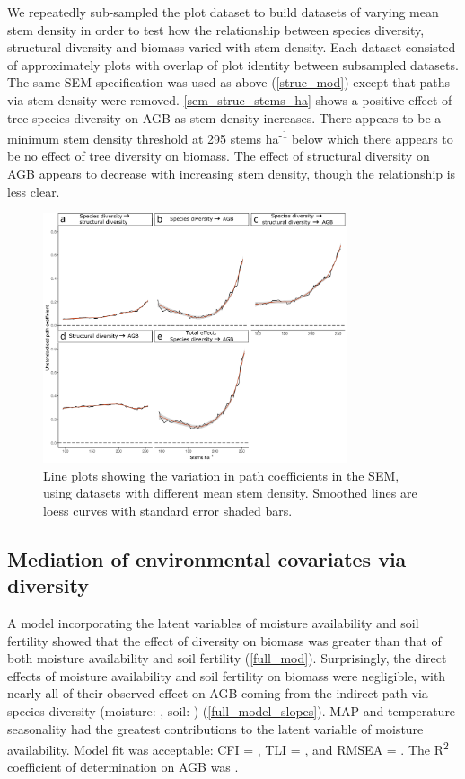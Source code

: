 \documentclass[11pt,a4paper]{article}
\begin{document}
We repeatedly sub-sampled the plot dataset to build \subn{} datasets of varying mean stem density in order to test how the relationship between species diversity, structural diversity and biomass varied with stem density. Each dataset consisted of approximately \subp{} plots with overlap of plot identity between subsampled datasets. The same SEM specification was used as above (\autoref{struc_mod}) except that paths via stem density were removed.  \autoref{sem_struc_stems_ha} shows a positive effect of tree species diversity on AGB as stem density increases. There appears to be a minimum stem density threshold at \textapprox{}295 stems ha\textsuperscript{-1} below which there appears to be no effect of tree diversity on biomass. The effect of structural diversity on AGB appears to decrease with increasing stem density, though the relationship is less clear.

\begin{figure}[H]
\centering
	\includegraphics[width=0.8\textwidth]{sem_struc_stems_ha}
	\caption{Line plots showing the variation in path coefficients in the SEM, using datasets with different mean stem density. Smoothed lines are loess curves with standard error shaded bars.}
	\label{sem_struc_stems_ha}
\end{figure}

\subsection{Mediation of environmental covariates via diversity}

A model incorporating the latent variables of moisture availability and soil fertility showed that the effect of diversity on biomass was greater than that of both moisture availability and soil fertility (\autoref{full_mod}). Surprisingly, the direct effects of moisture availability and soil fertility on biomass were negligible, with nearly all of their observed effect on AGB coming from the indirect path via species diversity (moisture: \rgmbd{}, soil: \rgsbd{}) (\autoref{full_model_slopes}). MAP and temperature seasonality had the greatest contributions to the latent variable of moisture availability. Model fit was acceptable: CFI = \fmcfi{}, TLI = \fmtli{}, and RMSEA = \fmrmsea{}. The R\textsuperscript{2} coefficient of determination on AGB was \fmrsq{}.
\end{document}
